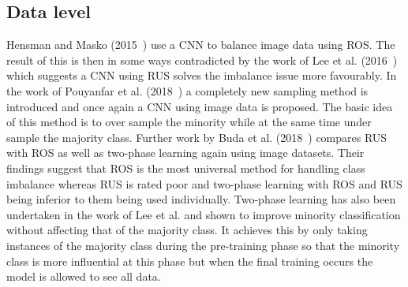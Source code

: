 \subsection{Data level}\label{subsec:DeepLearningDataLevel}
Hensman and Masko (2015~\cite{masko2015impact}) use a CNN to balance image data using ROS. The result of this is then in some ways contradicted by the work of Lee et al. (2016~\cite{lee2016plankton}) which suggests a CNN using RUS solves the imbalance issue more favourably. In the work of Pouyanfar et al. (2018~\cite{pouyanfar2018dynamic}) a completely new sampling method is introduced and once again a CNN using image data is proposed. The basic idea of this method is to over sample the minority while at the same time under sample the majority class. Further work by Buda et al. (2018~\cite{buda2018systematic}) compares RUS with ROS as well as two-phase learning again using image datasets. Their findings suggest that ROS is the most universal method for handling class imbalance whereas RUS is rated poor and two-phase learning with ROS and RUS being inferior to them being used individually. Two-phase learning has also been undertaken in the work of Lee et al. and shown to improve minority classification without affecting that of the majority class. It achieves this by only taking instances of the majority class during the pre-training phase so that the minority class is more influential at this phase but when the final training occurs the model is allowed to see all data. 
\par

